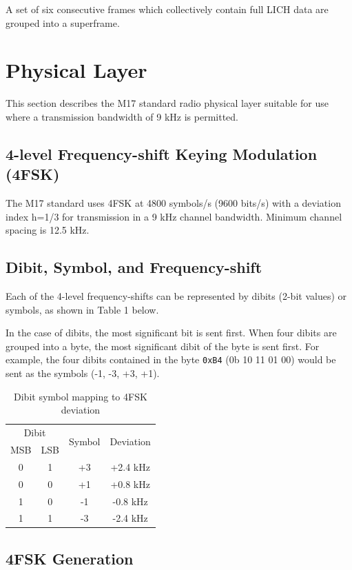 \documentclass[a4paper,11pt]{book}
\makeatletter
\renewcommand{\mainmatter}{\cleardoublepage\@mainmattertrue}
\makeatother
\begin{document}
A set of six consecutive frames which collectively contain full LICH
data are grouped into a superframe.

\mainmatter
\chapter{Physical Layer}

This section describes the M17 standard radio physical layer suitable
for use where a transmission bandwidth of 9 kHz is permitted.

\section{4-level Frequency-shift Keying Modulation (4FSK)}

The M17 standard uses 4FSK at 4800 symbols/s (9600 bits/s) with a deviation index h=1/3 for transmission in a 9 kHz channel bandwidth. Minimum channel spacing is 12.5 kHz.

\section{Dibit, Symbol, and Frequency-shift}

Each of the 4-level frequency-shifts can be represented by dibits (2-bit values) or symbols, as shown in Table 1 below.

In the case of dibits, the most significant bit is sent first. When four dibits are grouped into a byte, the most significant dibit of the byte
is sent first. For example, the four dibits contained in the byte \texttt{0xB4} (0b 10 11 01 00) would be sent as the symbols (-1, -3, +3, +1).

\begin{table}[H]
	\centering
	\begin{tabular}{|c|c|c|c|}
		\hline
		\multicolumn{2}{|c|}{Dibit} & \multirow{2}{*}{Symbol} & \multirow{2}{*}{Deviation} \\
		MSB & LSB &  &  \\
		\hline
		0 & 1 & +3 & +2.4 kHz \\
		0 & 0 & +1 & +0.8 kHz \\
		1 & 0 & -1 & -0.8 kHz \\
		1 & 1 & -3 & -2.4 kHz \\
		\hline
	\end{tabular}
	\caption{Dibit symbol mapping to 4FSK deviation}
\end{table}

\section{4FSK Generation}
\end{document}

